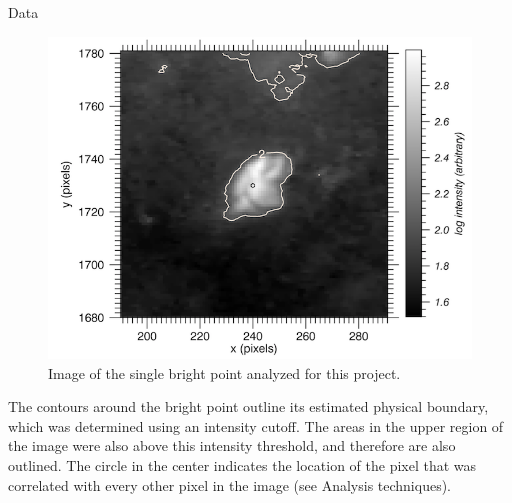 \documentclass[t]{beamer}
\begin{document}
\begin{frame}[t]
\begin{block}{}
\begin{columns}
\begin{block}{Data}
\begin{figure}
                \includegraphics[width=\textwidth]{../bp1_contour.png}
                \caption{Image of the single bright point analyzed for
                    this project.}
            \end{figure}
            The contours around the bright point
            outline its estimated physical boundary,
            which was determined using an intensity cutoff.
            The areas in the upper region of the image were also
            above this intensity threshold,
            and therefore are also outlined. The circle in the center indicates
            the location of the pixel that was correlated with every
            other pixel in the image (see \textcolor{mycyan}{Analysis techniques}).
        \end{block}


\end{columns}
\end{block}
\end{frame}
\end{document}
